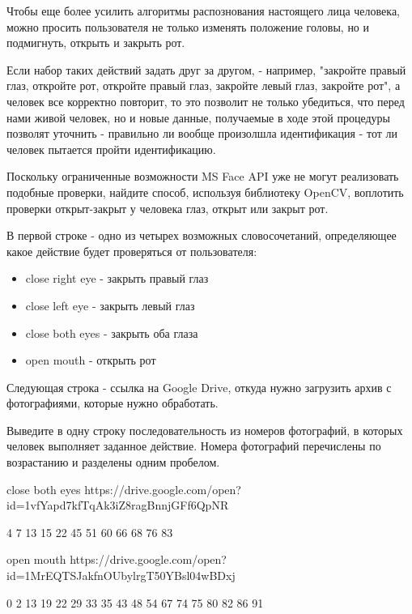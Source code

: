 
Чтобы еще более усилить алгоритмы распознования настоящего лица человека, можно просить пользователя не только изменять положение головы, но и подмигнуть, открыть и закрыть рот.


Если набор таких действий задать друг за другом, - например, "закройте правый глаз, 
откройте рот, откройте правый глаз, закройте левый глаз, закройте рот", а человек все 
корректно повторит, то это позволит не только убедиться, что перед нами живой человек, 
но и новые данные, получаемые в ходе этой процедуры позволят уточнить - правильно ли вообще произолшла идентификация - тот ли человек пытается пройти идентификацию.


Поскольку ограниченные возможности MS Face API уже не могут реализовать подобные проверки, найдите способ, используя библиотеку OpenCV, воплотить проверки открыт-закрыт у человека глаз, открыт или закрыт рот.


В первой строке - одно из четырех возможных словосочетаний, определяющее какое действие будет проверяться от пользователя:

\begin{itemize}
    \item close right eye - закрыть правый глаз
    \item close left eye - закрыть левый глаз
    \item close both eyes - закрыть оба глаза
    \item open mouth - открыть рот
\end{itemize}

Следующая строка - ссылка на Google Drive, откуда нужно загрузить архив с фотографиями, которые нужно обработать.

\outputfmtSection

Выведите в одну строку последовательность из номеров фотографий, в которых человек выполняет заданное действие. Номера фотографий перечислены по возрастанию и разделены одним пробелом.

\begin{myverbbox}[\small]{\vinput} 
    close both eyes
    https://drive.google.com/open?id=1vfYapd7kfTqAk3iZ8ragBnnjGFf6QpNR
\end{myverbbox}
\begin{myverbbox}[\small]{\voutput}
    4 7 13 15 22 45 51 60 66 68 76 83
\end{myverbbox}

\begin{myverbbox}[\small]{\vinput} 
    open mouth
    https://drive.google.com/open?id=1MrEQTSJakfnOUbylrgT50YBsl04wBDxj
\end{myverbbox}
\begin{myverbbox}[\small]{\voutput}
    0 2 13 19 22 29 33 35 43 48 54 67 74 75 80 82 86 91
\end{myverbbox}

